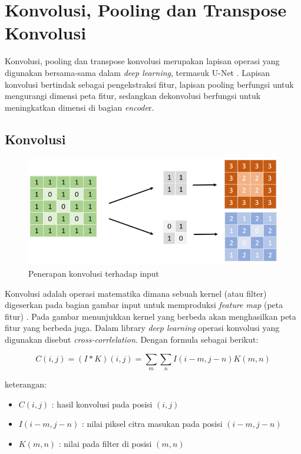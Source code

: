 \section{Konvolusi, Pooling dan Transpose Konvolusi}

\noindent Konvolusi, pooling dan transpose konvolusi merupakan lapisan operasi yang digunakan bersama-sama dalam \textit{deep learning}, termasuk U-Net \cite{goodfellow_deep_2016,pajankar_convolutional_2022,bishop_deep_2024}.  Lapisan konvolusi bertindak sebagai pengekstraksi fitur, lapisan pooling berfungsi untuk mengurangi dimensi peta fitur, sedangkan dekonvolusi berfungsi untuk meningkatkan dimensi di bagian \textit{encode}r. 

\subsection{Konvolusi}

\begin{figure}[H]
	\centering
	\includegraphics[scale=.6]{gambar/convolusi.png}
	\caption{Penerapan konvolusi terhadap input \cite{huang_fully_2022}}
	\label{fig:convolusi}
\end{figure}

\noindent Konvolusi adalah operasi matematika dimana sebuah kernel (atau filter) digeserkan pada bagian gambar input untuk memproduksi \textit{feature map} (peta fitur) \cite{pajankar_convolutional_2022}.  Pada gambar menunjukkan kernel yang berbeda akan menghasilkan peta fitur yang berbeda juga. Dalam library \textit{deep learning} operasi  konvolusi yang digunakan disebut \textit{cross-corrlelation}\cite{goodfellow_deep_2016}. Dengan formula sebagai berikut:

\begin{equation}
	C(i, j) = (I * K)(i, j) = \sum_{m} \sum_{n} I(i - m, j - n) K(m, n)
\end{equation}


\noindent
keterangan:
\begin{itemize}
	\item $C(i,j)$ : hasil konvolusi pada posisi $(i,j)$
	\item $I(i-m, j-n)$ : nilai piksel citra masukan pada posisi $(i-m, j-n)$
	\item $K(m,n)$ : nilai pada filter di posisi $(m,n)$
\end{itemize}

